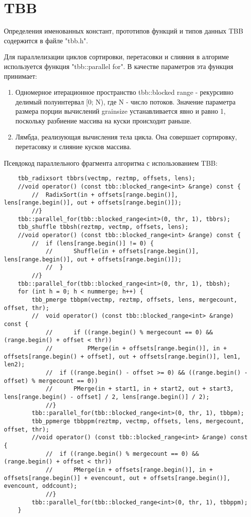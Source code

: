 \documentclass{report}
\begin{document}
\section*{TBB}
Определения именованных констант, прототипов функций и типов данных TBB содержится в файле "tbb.h".
\par Для параллелизации циклов сортировки, перетасовки и слияния в алгориме используется функция "tbb::parallel for". В качестве параметров эта функция принимает:
\begin{enumerate}
	\item Одномерное итерационное пространство tbb::blocked range - рекурсивно делимый полуинтервал [0; N), где N - число потоков. Значение параметра размера порции вычислений grainsize устанавливается явно и равно 1, поскольку разбиение массива на куски происходит раньше.
	\item Лямбда, реализующая вычисления тела цикла. Она совершает сортировку, перетасовку и слияние кусков массива.
\end{enumerate}
\par Псевдокод параллельного фрагмента алгоритма с использованием TBB:
\begin{lstlisting}
	tbb_radixsort tbbrs(vectmp, reztmp, offsets, lens);
	//void operator() (const tbb::blocked_range<int> &range) const {
		//	RadixSort(in + offsets[range.begin()], lens[range.begin()], out + offsets[range.begin()]);
		//}
	tbb::parallel_for(tbb::blocked_range<int>(0, thr, 1), tbbrs);
	tbb_shuffle tbbsh(reztmp, vectmp, offsets, lens);
	//void operator() (const tbb::blocked_range<int> &range) const {
		//	if (lens[range.begin()] != 0) {
			//		Shuffle(in + offsets[range.begin()], lens[range.begin()], out + offsets[range.begin()]);
			//	}
		//}
	tbb::parallel_for(tbb::blocked_range<int>(0, thr, 1), tbbsh);
	for (int h = 0; h < nummerge; h++) {
		tbb_pmerge tbbpm(vectmp, reztmp, offsets, lens, mergecount, offset, thr);
		//	void operator() (const tbb::blocked_range<int> &range) const {
			//		if ((range.begin() % mergecount == 0) && (range.begin() + offset < thr))
			//			PMerge(in + offsets[range.begin()], in + offsets[range.begin() + offset], out + offsets[range.begin()], len1, len2);
			//	if ((range.begin() - offset >= 0) && ((range.begin() - offset) % mergecount == 0)) 
			//		PMerge(in + start1, in + start2, out + start3, lens[range.begin() - offset] / 2, lens[range.begin()] / 2);
			//}	
		tbb::parallel_for(tbb::blocked_range<int>(0, thr, 1), tbbpm);
		tbb_ppmerge tbbppm(reztmp, vectmp, offsets, lens, mergecount, offset, thr);
		//void operator() (const tbb::blocked_range<int> &range) const {
			//	if ((range.begin() % mergecount == 0) && (range.begin() + offset < thr)) 
			//		PMerge(in + offsets[range.begin()], in + offsets[range.begin()] + evencount, out + offsets[range.begin()], evencount, oddcount);
			//}
		tbb::parallel_for(tbb::blocked_range<int>(0, thr, 1), tbbppm);
	}
\end{lstlisting}
\newpage
\end{document}
